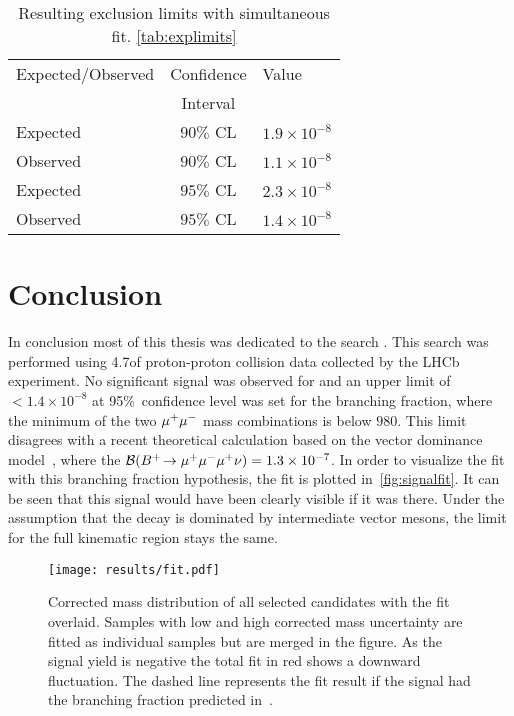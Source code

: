 \begin{table}[H]
\centering
\begin{tabular}{ l  c  l  }
\toprule
Expected/Observed & Confidence & Value  \\ 
 & Interval &  \\ \hline
Expected & $90\%$ CL & $ 1.9\times 10^{-8}$ \\
Observed & $90\%$ CL & $ 1.1\times 10^{-8}$ \\
Expected & $95\%$ CL & $ 2.3\times 10^{-8}$ \\
Observed & $95\%$ CL & $ 1.4\times 10^{-8}$ \\
\bottomrule
\end{tabular}
\caption{Resulting exclusion limits with simultaneous fit. \DIFaddbeginFL {}\autoref{tab:explimits}\DIFaddendFL }
\label{tab:limits}
\end{table}

\section{Conclusion}
In conclusion most of this thesis was dedicated to the search \DIFdelbegin {}\DIFdelend \DIFaddbegin {}\DIFaddend \Bmumumu.
This search was performed using 4.7\invfb of proton-proton collision data collected by the \gls{LHCb} experiment. No significant signal was observed for \Bmumumu and an upper limit of $< 1.4\times 10^{-8}$ at 95\%~confidence level was set for the branching fraction, where the minimum of the two ${\mu^+\mu^-}$ mass combinations is below $980$\mevcc. This limit disagrees with a recent theoretical calculation based on the vector dominance model~\cite{Danilina:2018uzr}, where the $\mathcal{B}({{{B}^+}}\!\rightarrow {\ensuremath{\mu^+\mu^-\mu^+}}\nu)=1.3\times 10^{-7}$. In order to visualize the fit with this branching fraction hypothesis, the fit is plotted in~\autoref{fig:signalfit}. It can be seen that this signal would have been clearly visible if it was there. Under the assumption that the decay is dominated by intermediate vector mesons, the limit for the full kinematic region stays the same.


\begin{figure}[t]
  \centering
  \texttt{[image: results/fit.pdf]}
  \caption{Corrected mass distribution of all selected \Bmumumu
    candidates with the fit overlaid. Samples with low and high
    corrected mass uncertainty are fitted as individual samples but
    are merged in the figure. As the signal yield is negative the total fit
    in red shows a downward fluctuation. The dashed line represents the fit
    result if the signal had the branching fraction predicted in~\cite{Danilina:2018uzr}.}
  \label{fig:signalfit}
\end{figure}


